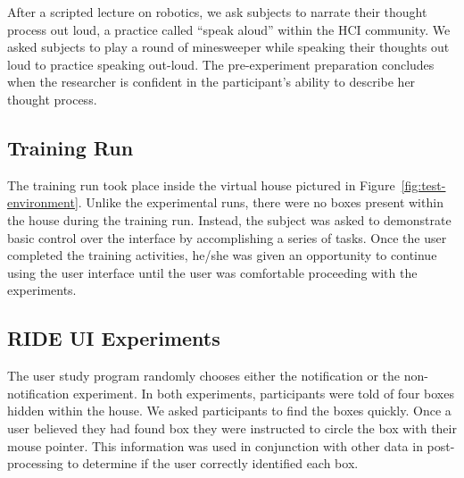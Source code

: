 After a scripted lecture on robotics, we ask subjects to narrate their thought process out loud, a practice called ``speak aloud'' within the HCI community. We asked subjects to play a round of minesweeper while speaking their thoughts out loud to practice speaking out-loud. The pre-experiment preparation concludes when the researcher is confident in the participant's ability to describe her thought process.

\subsection{Training Run} %
\label{sub:training_run}
The training run took place inside the virtual house pictured in Figure~\ref{fig:test-environment}. Unlike the experimental runs, there were no boxes present within the house during the training run. Instead, the subject was asked to demonstrate basic control over the interface by accomplishing a series of tasks. Once the user completed the training activities, he/she was given an opportunity to continue using the user interface until the user was comfortable proceeding with the experiments.

\subsection{RIDE UI Experiments} %
\label{sub:ride_ui_experiments}
The user study program randomly chooses either the notification or the non-notification experiment. In both experiments, participants were told of four boxes hidden within the house. We asked participants to find the boxes quickly. Once a user believed they had found box they were instructed to circle the box with their mouse pointer. This information was used in conjunction with other data in post-processing to determine if the user correctly identified each box.


